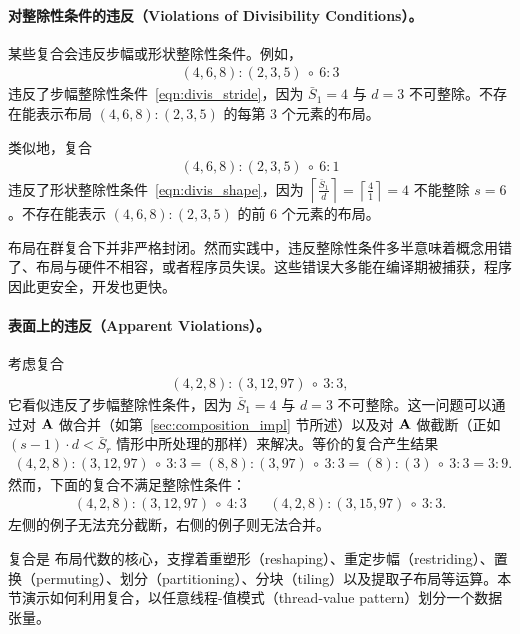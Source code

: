 \paragraph{对整除性条件的违反（Violations of Divisibility Conditions）。}
某些复合会违反步幅或形状整除性条件。例如，
\begin{align*}
(4,6,8):(2,3,5) \ \circ \  6:3
\end{align*}
违反了步幅整除性条件~\eqref{eqn:divis_stride}，因为 $\bar{S}_1 = 4$ 与 $d = 3$ 不可整除。不存在能表示布局 $(4,6,8):(2,3,5)$ 的每第 3 个元素的布局。

类似地，复合
\begin{align*}
(4,6,8):(2,3,5) \ \circ \  6:1
\end{align*}
违反了形状整除性条件~\eqref{eqn:divis_shape}，因为 $\left\lceil \frac{\bar{S}_1}{d} \right\rceil = \left\lceil \frac{4}{1} \right\rceil = 4$ 不能整除 $s = 6$。不存在能表示 $(4,6,8):(2,3,5)$ 的前 6 个元素的布局。

\CuTe 布局在群复合下并非严格封闭。然而实践中，违反整除性条件多半意味着概念用错了、布局与硬件不相容，或者程序员失误。这些错误大多能在编译期被捕获，程序因此更安全，开发也更快。

\paragraph{表面上的违反（Apparent Violations）。}

考虑复合
\begin{align*}
(4,2,8):(3,12,97) \ \circ \  3:3,
\end{align*}
它看似违反了步幅整除性条件，因为 $\bar{S}_1 = 4$ 与 $d = 3$ 不可整除。这一问题可以通过对 $\mathbf{A}$ 做合并（如第~\ref{sec:composition_impl} 节所述）以及对 $\mathbf{A}$ 做截断（正如 $(s-1) \cdot d < \bar{S}_r$ 情形中所处理的那样）来解决。等价的复合产生结果
\begin{align*}
(4,2,8):(3,12,97) \ \circ \  3:3 = (8,8):(3,97) \ \circ \  3:3 = (8):(3) \ \circ \  3:3 = 3:9.
\end{align*}
然而，下面的复合不满足整除性条件：
\begin{align*}
(4,2,8):(3,12,97) \ \circ \  4:3 && (4,2,8):(3,15,97) \ \circ \  3:3.
\end{align*}
左侧的例子无法充分截断，右侧的例子则无法合并。


\label{sec:layouttv}

复合是 \CuTe 布局代数的核心，支撑着重塑形（reshaping）、重定步幅（restriding）、置换（permuting）、划分（partitioning）、分块（tiling）以及提取子布局等运算。本节演示如何利用复合，以任意线程-值模式（thread-value pattern）划分一个数据张量。

